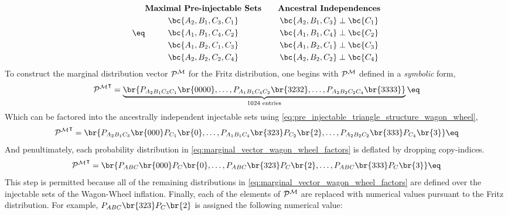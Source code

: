 \documentclass[aps, 10pt, english, twoside, pra, nofootinbib, tightenlines, longbibliography, superscriptaddress]{revtex4-1}
\begin{document}
    \begin{equation*}
        \eq \label{eq:pre_injectable_triangle_structure_wagon_wheel}
        \begin{gathered}
            \textbf{Maximal Pre-injectable Sets} \\
            \bc{A_2, B_1, C_3, C_1} \\
            \bc{A_1, B_1, C_4, C_2} \\
            \bc{A_1, B_2, C_1, C_3} \\
            \bc{A_2, B_2, C_2, C_4} \\
        \end{gathered}
        \qquad
        \begin{gathered}
            \textbf{Ancestral Independences} \\
            \bc{A_2, B_1, C_3} \ancestralindep \bc{C_1} \\
            \bc{A_1, B_1, C_4} \ancestralindep \bc{C_2} \\
            \bc{A_1, B_2, C_1} \ancestralindep \bc{C_3} \\
            \bc{A_2, B_2, C_2} \ancestralindep \bc{C_4} \\
        \end{gathered}
    \end{equation*}
    To construct the marginal distribution vector $\probvec^{\mscenario}$ for the Fritz distribution, one begins with $\probvec^{\mscenario}$ defined in a \textit{symbolic} form,
    \[ {\probvec^{\mscenario}}^{\intercal} = \underbrace{\br{\prob[A_2B_1C_3C_1]\br{0000}, \ldots, \prob[A_1B_1C_4C_2]\br{3232}, \ldots, \prob[A_2B_2C_2C_4]\br{3333}}}_{1024 \text{ entries}} \eq \label{eq:marginal_vector_wagon_wheel} \]
    Which can be factored into the ancestrally independent injectable sets using \cref{eq:pre_injectable_triangle_structure_wagon_wheel},
    \[ {\probvec^{\mscenario}}^{\intercal} = \br{\prob[A_2B_1C_3]\br{000}\prob[C_1]\br{0}, \ldots, \prob[A_1B_1C_4]\br{323}\prob[C_2]\br{2}, \ldots, \prob[A_2B_2C_2]\br{333}\prob[C_4]\br{3}} \eq \label{eq:marginal_vector_wagon_wheel_factors}\]
    And penultimately, each probability distribution in \cref{eq:marginal_vector_wagon_wheel_factors} is deflated by dropping copy-indices.
    \[ {\probvec^{\mscenario}}^{\intercal} = \br{\prob[ABC]\br{000}\prob[C]\br{0}, \ldots, \prob[ABC]\br{323}\prob[C]\br{2}, \ldots, \prob[ABC]\br{333}\prob[C]\br{3}} \eq \label{eq:marginal_vector_wagon_wheel_factors_dropped}\]
    This step is permitted because all of the remaining distributions in \cref{eq:marginal_vector_wagon_wheel_factors} are defined over the injectable sets of the Wagon-Wheel inflation. Finally, each of the elements of $\probvec^{\mscenario}$ are replaced with numerical values pursuant to the Fritz distribution. For example, $\prob[ABC]\br{323}\prob[C]\br{2}$ is assigned the following numerical value:
\end{document}
